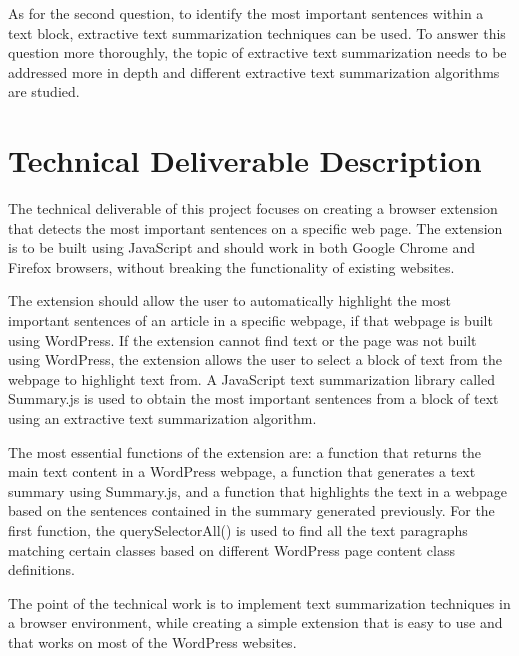 \documentclass[conference,compsoc]{IEEEtran}
\begin{document}
As for the second question, to identify the most important sentences within a text block, extractive text summarization techniques can be used. To answer this question more thoroughly, the topic of extractive text summarization needs to be addressed more in depth and different extractive text summarization algorithms are studied.



\section{ Technical Deliverable Description}

The technical deliverable of this project focuses on creating a browser extension that detects the most important sentences on a specific web page. The extension is to be built using JavaScript and should work in both Google Chrome and Firefox browsers, without breaking the functionality of existing websites.

The extension should allow the user to automatically highlight the most important sentences of an article in a specific webpage, if that webpage is built using WordPress. If the extension cannot find text or the page was not built using WordPress, the extension allows the user to select a block of text from the webpage to highlight text from. A JavaScript text summarization library called Summary.js is used to obtain the most important sentences from a block of text using an extractive text summarization algorithm.

The most essential functions of the extension are: a function that returns the main text content in a WordPress webpage, a function that generates a text summary using Summary.js, and a function that highlights the text in a webpage based on the sentences contained in the summary generated previously. For the first function, the querySelectorAll() is used to find all the text paragraphs matching certain classes based on different WordPress page content class definitions.

The point of the technical work is to implement text summarization techniques in a browser environment, while creating a simple extension that is easy to use and that works on most of the WordPress websites.


\end{document}
